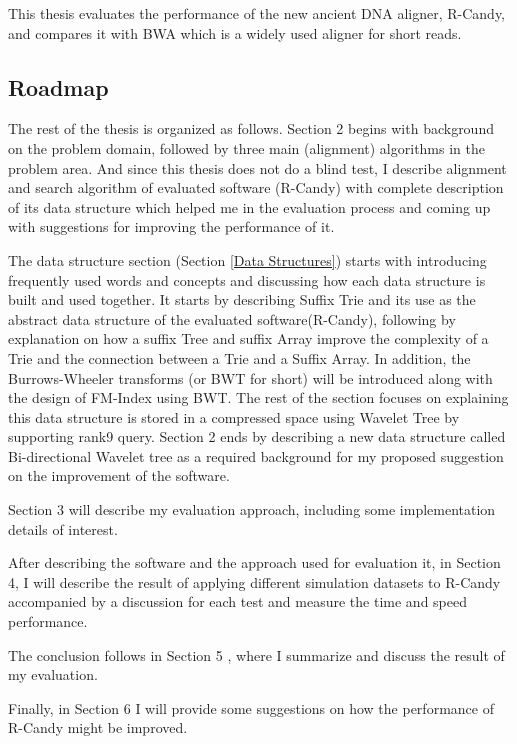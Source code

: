 \documentclass[11pt,a4paper]{report}
\begin{document}
This thesis evaluates the performance of the new ancient DNA aligner,
R-Candy, and compares it with BWA which is a widely used aligner for
short reads.




\subsection{Roadmap} \label{Roadmap}


The rest of the thesis is organized as follows.
Section 2 begins with background on the problem domain, followed by three main 
(alignment) algorithms in the problem area. And since this thesis does not do
a blind test, I describe alignment and search algorithm of evaluated software 
(R-Candy) with complete description of its data structure which helped me in the 
evaluation process and coming up with suggestions for improving the performance
of it.

The data structure section (Section \ref{Data Structures}) starts with introducing 
frequently used words and concepts and discussing how each data structure is 
built and used together. It starts by describing Suffix Trie and its use as the
abstract data structure of the evaluated software(R-Candy), following by 
explanation on  how a suffix Tree and suffix Array improve the complexity of a 
Trie and the connection between a Trie and a Suffix Array. In addition, the
Burrows-Wheeler transforms (or BWT for short) will be introduced along with the
design of FM-Index using BWT. The rest of the section focuses on explaining this 
data structure  is stored in a compressed space using Wavelet Tree by supporting
rank9 query. Section 2 ends by describing a new data structure called 
Bi-directional Wavelet tree as a required background for my proposed 
suggestion on the improvement of the software.

Section 3 will describe my evaluation approach, including some implementation 
details of interest.

After describing the software and the approach used for evaluation it, in 
Section 4, I will describe the result of applying different simulation datasets
to R-Candy accompanied by a discussion for each test and measure the time and 
speed performance.

The conclusion follows in Section 5 , where I summarize and discuss the result 
of my evaluation.

Finally, in Section 6 I will provide some suggestions on how the performance of
R-Candy might be improved. 
\end{document}
